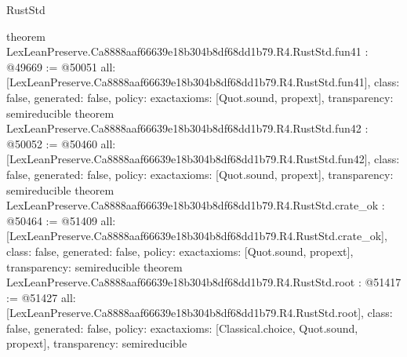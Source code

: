 \begin{lexlean}{RustStd}
\begin{coremodule}
{}
theorem LexLeanPreserve.Ca8888aaf66639e18b304b8df68dd1b79.R4.RustStd.fun41 : @49669 := @50051 {
  all: [LexLeanPreserve.Ca8888aaf66639e18b304b8df68dd1b79.R4.RustStd.fun41],
  class: false,
  generated: false,
  policy: exact{axioms: [Quot.sound, propext]},
  transparency: semireducible
}
theorem LexLeanPreserve.Ca8888aaf66639e18b304b8df68dd1b79.R4.RustStd.fun42 : @50052 := @50460 {
  all: [LexLeanPreserve.Ca8888aaf66639e18b304b8df68dd1b79.R4.RustStd.fun42],
  class: false,
  generated: false,
  policy: exact{axioms: [Quot.sound, propext]},
  transparency: semireducible
}
theorem LexLeanPreserve.Ca8888aaf66639e18b304b8df68dd1b79.R4.RustStd.crate_ok : @50464 := @51409 {
  all: [LexLeanPreserve.Ca8888aaf66639e18b304b8df68dd1b79.R4.RustStd.crate_ok],
  class: false,
  generated: false,
  policy: exact{axioms: [Quot.sound, propext]},
  transparency: semireducible
}
theorem LexLeanPreserve.Ca8888aaf66639e18b304b8df68dd1b79.R4.RustStd.root : @51417 := @51427 {
  all: [LexLeanPreserve.Ca8888aaf66639e18b304b8df68dd1b79.R4.RustStd.root],
  class: false,
  generated: false,
  policy: exact{axioms: [Classical.choice, Quot.sound, propext]},
  transparency: semireducible
}


\end{coremodule}
\end{lexlean}
